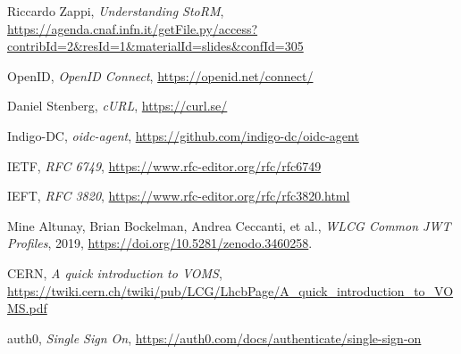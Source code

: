 \begin{thebibliography}{99}
	Riccardo Zappi, \textit{Understanding StoRM},
	\url{https://agenda.cnaf.infn.it/getFile.py/access?contribId=2&resId=1&materialId=slides&confId=305}

	OpenID, 
	\textit{OpenID Connect},
	\url{https://openid.net/connect/}

	Daniel Stenberg, \textit{cURL}, 
	\url{https://curl.se/}

	Indigo-DC, \textit{oidc-agent}, 
	\url{https://github.com/indigo-dc/oidc-agent}

	IETF, 
	\textit{RFC 6749},
	\url{https://www.rfc-editor.org/rfc/rfc6749}

	IEFT,
	\textit{RFC 3820},
	\url{https://www.rfc-editor.org/rfc/rfc3820.html}

	Mine Altunay, Brian Bockelman, Andrea Ceccanti, et al., \textit{WLCG Common JWT Profiles}, 2019,
	\url{https://doi.org/10.5281/zenodo.3460258}.

	CERN, \textit{A quick introduction to VOMS},
	\url{https://twiki.cern.ch/twiki/pub/LCG/LhcbPage/A_quick_introduction_to_VOMS.pdf}

	auth0, \textit{Single Sign On},
	\url{https://auth0.com/docs/authenticate/single-sign-on}

\end{thebibliography}